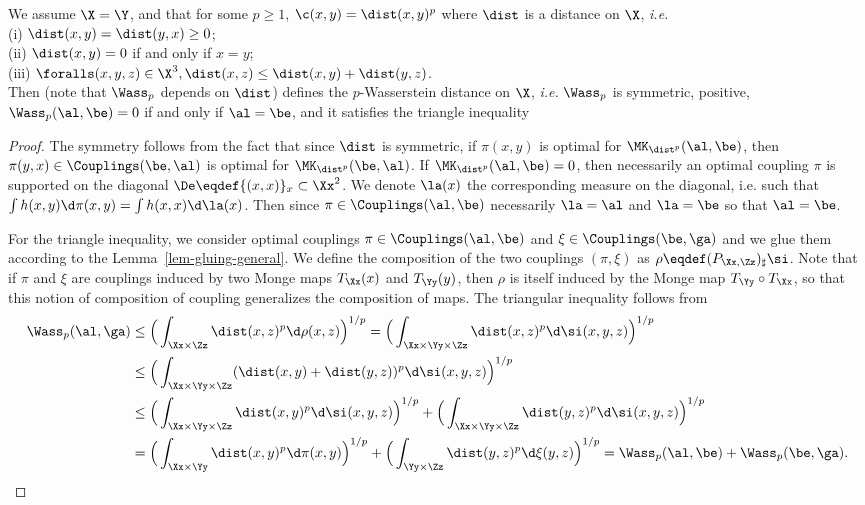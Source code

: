 \begin{prop}\label{prop-metric-measure}
We assume $\X=\Y$, and that for some $p \geq 1$, $\c(x,y)=\dist(x,y)^p$ where $\dist$ is a distance on $\X$, \emph{i.e.} \\
	\hbox{}\qquad (i) $\dist(x,y) = \dist(y,x) \geq 0$;  \\
	\hbox{}\qquad (ii)  $\dist(x,y)=0$ if and only if $x=y$;  \\
	\hbox{}\qquad (iii)  $\foralls (x,y,z) \in \X^3, \dist(x,z) \leq \dist(x,y)+\dist(y,z)$. \\
Then
(note that $\Wass_p$ depends on $\dist$) defines the $p$-Wasserstein distance on $\X$, \emph{i.e.} $\Wass_p$ is symmetric, positive, $\Wass_p(\al,\be)=0$ if and only if $\al = \be$, and it satisfies the triangle inequality
\end{prop}

\begin{proof}
	The symmetry follows from the fact that since $\dist$ is symmetric, if $\pi(x,y)$ is optimal for $\MK_{\dist^p}(\al,\be)$, then
	$\pi(y,x) \in \Couplings(\be,\al)$ is optimal for $\MK_{\dist^p}(\be,\al)$.
	If $\MK_{\dist^p}(\al,\be)=0$, then necessarily an optimal coupling $\pi$ is supported on the diagonal $\De \eqdef \{(x,x)\}_x \subset \Xx^2$.
	We denote $\la(x)$ the corresponding measure on the diagonal, i.e. such that $\int h(x,y) \d\pi(x,y) = \int h(x,x) \d \la(x)$.
	Then since $\pi \in \Couplings(\al,\be)$ necessarily $\la=\al$ and $\la=\be$ so that $\al=\be$.

	For the triangle inequality, we consider optimal couplings $\pi \in \Couplings(\al,\be)$ and $\xi \in \Couplings(\be,\ga)$
	and we glue them according to the Lemma~\ref{lem-gluing-general}.
		We define the composition of the two couplings $(\pi,\xi)$ as $\rho \eqdef (P_{\Xx,\Zz})_\sharp \si$.
	Note that if $\pi$ and $\xi$ are couplings induced by two Monge maps $T_\Xx(x)$ and $T_\Yy(y)$, then $\rho$ is itself induced by the Monge map $T_\Yy \circ T_\Xx$, so that this notion of composition of coupling generalizes the composition of maps.
	The triangular inequality follows from
	$$\begin{aligned}
		\Wass_p(\al,\ga) & \leq \Big( \int_{\Xx \times \Zz} \dist(x,z)^p \d\rho(x,z)\Big)^{1/p}
		= \Big( \int_{\Xx \times \Yy \times \Zz} \dist(x,z)^p \d\si(x,y,z)\Big)^{1/p}		\\
		 &\leq \Big( \int_{\Xx \times \Yy \times \Zz} (\dist(x,y)+\dist(y,z))^p \d\si(x,y,z)\Big)^{1/p} \\
		 &\leq \Big( \int_{\Xx \times \Yy \times \Zz} \dist(x,y)^p \d\si(x,y,z)\Big)^{1/p}
		    +  \Big( \int_{\Xx \times \Yy \times \Zz} \dist(y,z)^p \d\si(x,y,z)\Big)^{1/p} \\
	  &= \Big( \int_{\Xx \times \Yy} \dist(x,y)^p \d\pi(x,y)\Big)^{1/p}
		    +  \Big( \int_{\Yy \times \Zz} \dist(y,z)^p \d\xi(y,z)\Big)^{1/p}
		    = \Wass_p(\al,\be)  + \Wass_p(\be,\ga) .
	\end{aligned}$$
\end{proof}

